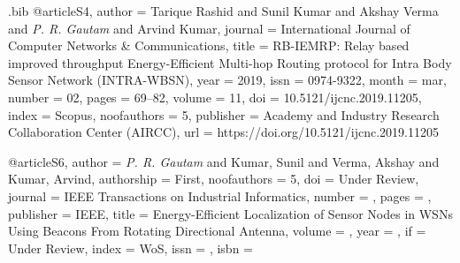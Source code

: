 \begin{filecontents}{\jobname .bib}
@article{S4,
  author      = {Tarique Rashid and Sunil Kumar and Akshay Verma and \emph{P. R. Gautam} and Arvind Kumar},
  journal     = {International Journal of Computer Networks {\&} Communications},
  title       = {{RB}-{IEMRP}: Relay based improved throughput Energy-Efficient Multi-hop Routing protocol for Intra Body Sensor Network ({INTRA}-{WBSN})},
  year        = {2019},
  issn        = {0974-9322},
  month       = {mar},
  number      = {02},
  pages       = {69--82},
  volume      = {11},
  doi         = {10.5121/ijcnc.2019.11205},
  index       = {Scopus},
  noofauthors = {5},
  publisher   = {Academy and Industry Research Collaboration Center ({AIRCC})},
  url         = {https://doi.org/10.5121/ijcnc.2019.11205}
}



@article{S6,
  author      = {\emph{P. R. Gautam} and Kumar, Sunil and Verma, Akshay and Kumar, Arvind},
  authorship  = {First},
  noofauthors = {5},
  doi         = {Under Review},
  journal     = {IEEE Transactions on Industrial Informatics},
  number      = {},
  pages       = {},
  publisher   = {IEEE},
  title       = {Energy-Efficient Localization of Sensor Nodes in WSNs Using Beacons From Rotating Directional Antenna},
  volume      = {},
  year        = {},
  if          = {Under Review},
  index       = {WoS},
  issn        = {},
  isbn        = {}
}






\end{filecontents}


\documentclass[t,hyperref={pdfpagemode=FullScreen,colorlinks=false},
xcolor={dvipsnames,svgnames,table},9pt]{beamer}
\usepackage{tikz}
\def\mytitle{Research Profile for KL University}
\def\mysubtitle{}
\def\myshorttitle{Localization in WSN using Single Anchor Node}


{
  \usetheme{Warsaw}

 \setbeamercovered{transparent}
}
[default]
[default]
[numbered]

